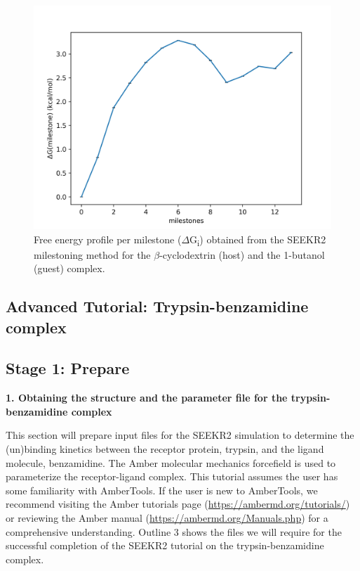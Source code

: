 \documentclass[9pt,training,pubversion]{livecoms}
\newcommand{\ambertutorialslink}{\url{https://ambermd.org/tutorials/}}
\newcommand{\ambermanuallink}{\url{https://ambermd.org/Manuals.php}}
\begin{document}
\begin{figure}[H]
\centering
\includegraphics[scale=0.60]{images/figure5.png} 
\caption{Free energy profile per milestone ($\Delta$G\textsubscript{i}) obtained from the SEEKR2 milestoning method for the $\beta$-cyclodextrin (host) and the 1-butanol (guest) complex.}
\label{figure5}
\end{figure} 

\subsection{Advanced Tutorial: Trypsin-benzamidine complex} \label{tryp_ben}
\vspace{2mm}

\subsection*{Stage 1: Prepare}
\vspace{2mm}

\noindent \textbf{1. Obtaining the structure and the parameter file for the trypsin-benzamidine complex} \par
\vspace{2mm}

\noindent This section will prepare input files for the SEEKR2 simulation to determine the (un)binding kinetics between the receptor protein, trypsin, and the ligand molecule, benzamidine. The Amber molecular mechanics forcefield is used to parameterize the receptor-ligand complex. This tutorial assumes the user has some familiarity with AmberTools. If the user is new to AmberTools, we recommend visiting the Amber tutorials page (\ambertutorialslink) or reviewing the Amber manual (\ambermanuallink) for a comprehensive understanding. Outline 3 shows the files we will require for the successful completion of the SEEKR2 tutorial on the trypsin-benzamidine complex.
\end{document}
